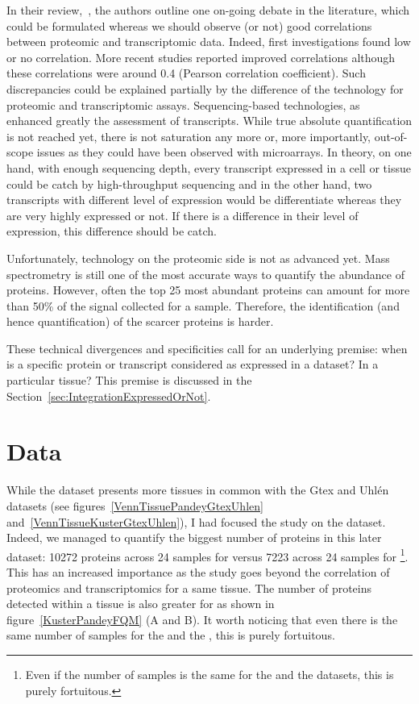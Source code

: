 In their review,~\cite{Uhlen:2016}, the authors outline one on-going debate
in the literature, which could be formulated whereas we should observe (or not)
good correlations between proteomic and transcriptomic data.
Indeed, first investigations found low or no correlation. More recent
studies reported improved correlations although these correlations were around
0.4 (Pearson correlation coefficient). Such discrepancies could be explained
partially by the difference of the technology for proteomic and transcriptomic
assays. Sequencing-based technologies, as \Rnaseq\, enhanced greatly the
assessment of transcripts. While true absolute quantification is not reached yet, there is not saturation any more or, more importantly, out-of-scope issues as
they could have been observed with microarrays. In theory, on one hand, with
enough sequencing depth, every transcript expressed in a cell or tissue could be
catch by high-throughput sequencing and in the other hand, two transcripts with
different level of expression would be differentiate whereas they are very highly
expressed or not. If there is a difference in their level of expression, this
difference should be catch.

Unfortunately, technology on the proteomic side is not as advanced yet.
Mass spectrometry is still one of the most accurate ways to quantify the
abundance of proteins. However, often the top 25 most abundant proteins can
amount for more than 50\% of the signal collected for a sample. Therefore, the
identification (and hence quantification) of the scarcer proteins is harder.


These technical divergences and specificities call for an underlying premise:
when is a specific protein or transcript considered as expressed in a dataset?
In a particular tissue? This premise is discussed
in the Section~\ref{sec:IntegrationExpressedOrNot}.



\section{Data}
\label{sec:IntegrationData}
While the  dataset presents more tissues in common
with the Gtex and Uhlén datasets (see figures~\ref{VennTissuePandeyGtexUhlen}
and~\ref{VennTissueKusterGtexUhlen}), I had focused the study on
the  dataset. Indeed, we managed to quantify the biggest number
of proteins in this later dataset: 10272 proteins across 24 samples for
 versus 7223 across 24 samples for \footnote{Even
if the number of samples is the same for the  and
the  datasets, this is purely fortuitous.}.
This has an increased importance as the study goes beyond the correlation of
proteomics and transcriptomics for a same tissue. The number of proteins
detected within a tissue is also greater for  as shown
in figure~\ref{KusterPandeyFQM} (A and B).
It worth noticing that even there is the same number of samples for the
 and the , this is purely fortuitous.

